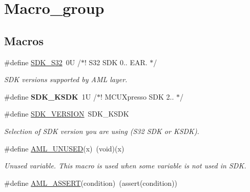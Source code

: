 \hypertarget{group__macro__group}{}\section{Macro\+\_\+group}
\label{group__macro__group}
\subsection*{Macros}
\begin{DoxyCompactItemize}
\item 
\mbox{\label{group__macro__group_ga5b312ec7a12c5405c055344d00b90440}} 
\#define \mbox{\hyperlink{group__macro__group_ga5b312ec7a12c5405c055344d00b90440}{S\+D\+K\+\_\+\+S32}}~0\+U              /$\ast$! S32 S\+D\+K 0.. E\+A\+R. $\ast$/
\begin{DoxyCompactList}\small\item\em S\+DK versions supported by A\+ML layer. \end{DoxyCompactList}\item 
\mbox{\label{group__macro__group_gaa450acefc0219b31ab56b4290da03e77}} 
\#define {\bfseries S\+D\+K\+\_\+\+K\+S\+DK}~1\+U              /$\ast$! M\+C\+U\+Xpresso S\+D\+K 2.. $\ast$/
\item 
\#define \mbox{\hyperlink{group__macro__group_ga320c0ce8fc9d4967696a15bfe0c17129}{S\+D\+K\+\_\+\+V\+E\+R\+S\+I\+ON}}~S\+D\+K\+\_\+\+K\+S\+DK
\begin{DoxyCompactList}\small\item\em Selection of S\+DK version you are using (S32 S\+DK or K\+S\+DK). \end{DoxyCompactList}\item 
\mbox{\label{group__macro__group_ga1e7b240858ecd40d070e5db823f56502}} 
\#define \mbox{\hyperlink{group__macro__group_ga1e7b240858ecd40d070e5db823f56502}{A\+M\+L\+\_\+\+U\+N\+U\+S\+ED}}(x)~(void)(x)
\begin{DoxyCompactList}\small\item\em Unused variable. This macro is used when some variable is not used in S\+DK. \end{DoxyCompactList}\item 
\#define \mbox{\hyperlink{group__macro__group_gacf378012c67f22a3ce3f8ca5521dd400}{A\+M\+L\+\_\+\+A\+S\+S\+E\+RT}}(condition)~(assert(condition))

\end{DoxyCompactItemize}
